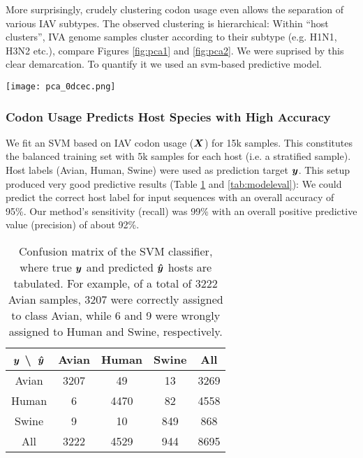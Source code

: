 More surprisingly, crudely clustering codon usage even allows the separation of various IAV subtypes. The observed clustering is hierarchical: Within ``host clusters'', IVA genome samples cluster according to their subtype (e.g. H1N1, H3N2 etc.), compare Figures \ref{fig:pca1} and \ref{fig:pca2}. We were suprised by this clear demarcation. To quantify it we used an \gls{svm}-based predictive model.


\begin{sidewaysfigure}
    \begin{center}\texttt{[image: pca\_0dcec.png]}\end{center}
    \caption[Subtype-specific clusters of codon usage via PCA.]{PCA of codon usage creates subtype specific clusters that are nested within larger host-specific clusters (compare Figure \ref{fig:pca1}). This is plausible because many subtypes prefer one host over another. Plot components are the same as in Figure \ref{fig:pca1}.}
    \label{fig:pca2}
\end{sidewaysfigure}


\subsubsection{Codon Usage Predicts Host Species with High Accuracy}

We fit an SVM based on IAV codon usage ($\hm{X}$) for 15k samples. This constitutes the balanced training set with 5k samples for each host (i.e. a stratified sample). Host labels (Avian, Human, Swine) were used as prediction target $\hm{y}$. This setup produced very good predictive results (Table \ref{tab:confusion-main} and \ref{tab:modeleval}): We could predict the correct host label for input sequences with an overall accuracy of 95\%. Our method's sensitivity (recall) was 99\% with an overall positive predictive value (precision) of about 92\%.


\begin{table}[htbp]
    \centering
    \begin{tabular}{c | c | c | c | c}
        $\hm{y}$ \textbackslash~$\hm{\hat{y}}$ & Avian & Human & Swine & All \\
        \hline
        Avian   & 3207  & 49    & 13    & 3269 \\
        Human   & 6     & 4470  & 82    & 4558 \\
        Swine   & 9     & 10    & 849   & 868  \\
        All     & 3222  & 4529  & 944   & 8695 \\
    \end{tabular}
    \caption[SVM classifier: Confusion matrix.]{Confusion matrix of the SVM classifier, where true $\hm{y}$ and predicted $\hm{\hat{y}}$ hosts are tabulated. For example, of a total of 3222 Avian samples, 3207 were correctly assigned to class Avian, while 6 and 9 were wrongly assigned to Human and Swine, respectively.}
    \label{tab:confusion-main}
\end{table}


